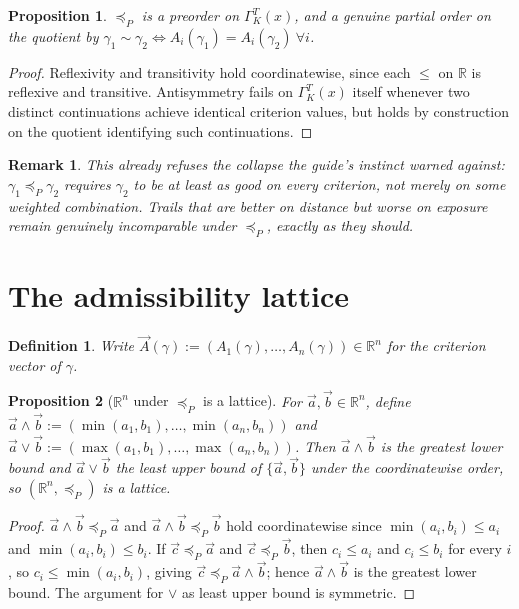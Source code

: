 \documentclass[11pt]{report}
\newtheorem{proposition}{Proposition}[chapter]
\newtheorem{definition}{Definition}[chapter]
\newtheorem{remark}{Remark}[chapter]
\begin{document}
\begin{proposition}
$\preceq_P$ is a preorder on $\Gamma_K^T(x)$, and a genuine partial
order on the quotient by $\gamma_1 \sim \gamma_2 \iff A_i(\gamma_1) =
A_i(\gamma_2)\ \forall i$.
\end{proposition}
\begin{proof}
Reflexivity and transitivity hold coordinatewise, since each
$\leq$ on $\mathbb{R}$ is reflexive and transitive. Antisymmetry fails
on $\Gamma_K^T(x)$ itself whenever two distinct continuations achieve
identical criterion values, but holds by construction on the quotient
identifying such continuations.
\end{proof}

\begin{remark}
This already refuses the collapse the guide's instinct warned against:
$\gamma_1 \preceq_P \gamma_2$ requires $\gamma_2$ to be at least as good
on \emph{every} criterion, not merely on some weighted combination.
Trails that are better on distance but worse on exposure remain
genuinely incomparable under $\preceq_P$, exactly as they should.
\end{remark}

\section*{The admissibility lattice}

\begin{definition}
Write $\vec A(\gamma) := (A_1(\gamma), \dots, A_n(\gamma)) \in
\mathbb{R}^n$ for the criterion vector of $\gamma$.
\end{definition}

\begin{proposition}[$\mathbb{R}^n$ under $\preceq_P$ is a lattice]
For $\vec a, \vec b \in \mathbb{R}^n$, define
$\vec a \wedge \vec b := (\min(a_1,b_1), \dots, \min(a_n,b_n))$ and
$\vec a \vee \vec b := (\max(a_1,b_1), \dots, \max(a_n,b_n))$. Then
$\vec a \wedge \vec b$ is the greatest lower bound and
$\vec a \vee \vec b$ the least upper bound of $\{\vec a, \vec b\}$
under the coordinatewise order, so $(\mathbb{R}^n, \preceq_P)$ is a
lattice.
\end{proposition}
\begin{proof}
$\vec a \wedge \vec b \preceq_P \vec a$ and $\vec a \wedge \vec b
\preceq_P \vec b$ hold coordinatewise since $\min(a_i,b_i) \leq a_i$
and $\min(a_i,b_i) \leq b_i$. If $\vec c \preceq_P \vec a$ and
$\vec c \preceq_P \vec b$, then $c_i \leq a_i$ and $c_i \leq b_i$ for
every $i$, so $c_i \leq \min(a_i,b_i)$, giving
$\vec c \preceq_P \vec a \wedge \vec b$; hence $\vec a \wedge \vec b$
is the greatest lower bound. The argument for $\vee$ as least upper
bound is symmetric.
\end{proof}
\end{document}
